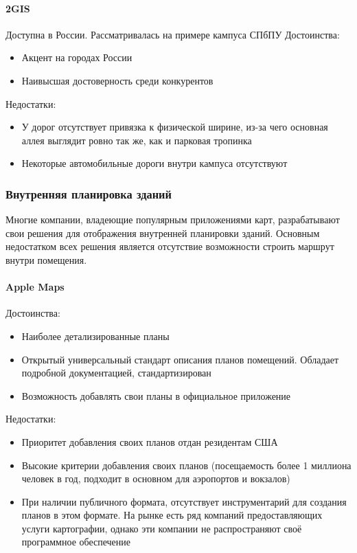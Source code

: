 
      \paragraph{2GIS}
        Доступна в России. Рассматривалась на примере кампуса СПбПУ
        \noindent Достоинства:
        \begin{itemize}
          \item Акцент на городах России
          \item Наивысшая достоверность среди конкурентов
        \end{itemize}

        \noindent Недостатки:
        \begin{itemize}
          \item У дорог отсутствует привязка к физической ширине, из-за чего основная аллея выглядит ровно так же, как и парковая тропинка
          \item Некоторые автомобильные дороги внутри кампуса отсутствуют
        \end{itemize}




    \subsubsection{Внутренняя планировка зданий}
      Многие компании, владеющие популярным приложениями карт, разрабатывают свои решения для отображения внутренней планировки зданий. Основным недостатком всех решения является отсутствие возможности строить маршрут внутри помещения.
      \paragraph{Apple Maps}
        \noindent Достоинства:
        \begin{itemize}
          \item Наиболее детализированные планы
          \item Открытый универсальный стандарт описания планов помещений. Обладает подробной документацией, стандартизирован \cite{IMDFOGC}
          \item Возможность добавлять свои планы в официальное приложение
        \end{itemize}

        \noindent Недостатки:
        \begin{itemize}
          \item Приоритет добавления своих планов отдан резидентам США
          \item Высокие критерии добавления своих планов (посещаемость более 1 миллиона человек в год, подходит в основном для аэропортов и вокзалов)
          \item При наличии публичного формата, отсутствует инструментарий для создания планов в этом формате. На рынке есть ряд компаний предоставляющих услуги картографии, однако эти компании не распространяют своё программное обеспечение
        \end{itemize}

